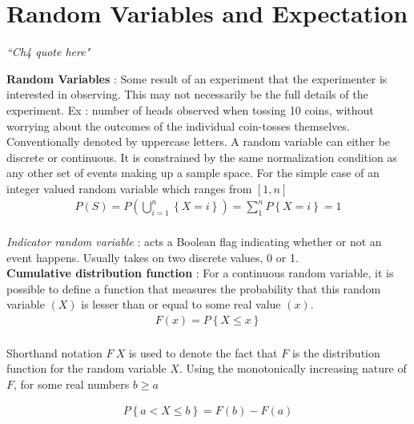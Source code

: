 \chapter{Random Variables and Expectation}


\begin{flushright}
	\textit{``Ch4 quote here"} \\
\end{flushright}

\textbf{Random Variables} : Some result of an experiment that the experimenter is interested in observing. This may not necessarily be the full details of the experiment. Ex : number of heads observed when tossing 10 coins, without worrying about the outcomes of the individual coin-tosses themselves. \\

Conventionally denoted by uppercase letters. A random variable can either be discrete or continuous. It is constrained by the same normalization condition as any other set of events making up a sample space. For the simple case of an integer valued random variable which ranges from $ \left[1, n\right] $\\

\begin{align}
	P(S) = P \left( \bigcup_{i = 1}^{n}\left\{X = i\right\} \right) = \sum_{1}^{n} P \left\{X = i\right\} = 1
\end{align} \\

\textit{Indicator random variable} : acts a Boolean flag indicating whether or not an event happens. Usually takes on two discrete values, 0 or 1. \\

\textbf{Cumulative distribution function} : For a continuous random variable, it is possible to define a function that measures the probability that this random variable $ (X) $ is lesser than or equal to some real value $ (x) $.\\

\begin{align}
	F(x) = P \left\{ X \leq x \right\}
\end{align} \\

Shorthand notation $ F ~ X $ is used to denote the fact that $ F $ is the distribution function for the random variable $ X $. Using the monotonically increasing nature of $ F $, for some real numbers $ b \geq a $

\begin{align}
	P \left\{ a < X \leq b \right\} = F(b) - F(a)
\end{align} \\

